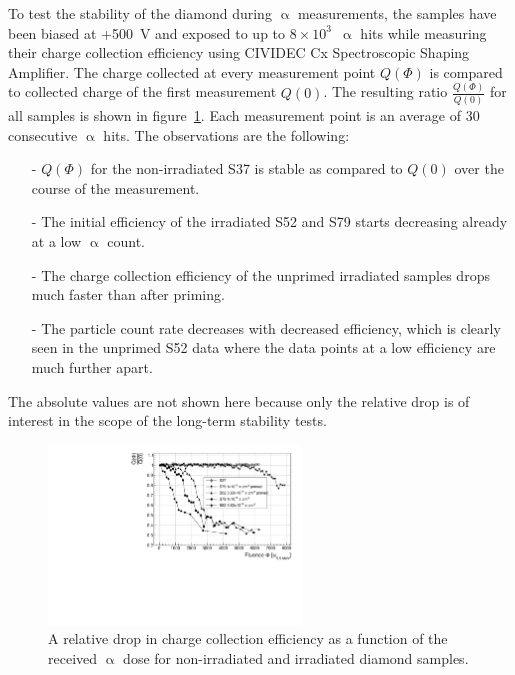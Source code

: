 
To test the stability of the diamond during $\upalpha$ measurements, the samples have been biased at +500~V and exposed to up to $8\times10^3$~$\upalpha$ hits while measuring their charge collection efficiency using CIVIDEC Cx Spectroscopic Shaping Amplifier. The charge collected at every measurement point $Q(\Phi)$ is compared to collected charge of the first measurement $Q(0)$. The resulting ratio $\frac{Q(\Phi)}{Q(0)}$ for all samples is shown in figure~\ref{fig:longtermcx}. Each measurement point is an average of 30 consecutive $\upalpha$ hits. The observations are the following:
\begin{itemize}
\item[-] $Q(\Phi)$ for the non-irradiated S37 is stable as compared to $Q(0)$ over the course of the measurement.
\item[-] The initial efficiency of the irradiated S52 and S79 starts decreasing already at a low $\upalpha$ count.
\item[-] The charge collection efficiency of the unprimed irradiated samples drops much faster than after priming.
\item[-] The particle count rate decreases with decreased efficiency, which is clearly seen in the unprimed S52 data where the data points at a low efficiency are much further apart.
\end{itemize}
The absolute values are not shown here because only the relative drop is of interest in the scope of the long-term stability tests.

\begin{figure}[!t]
\begin{center}
\includegraphics[width=0.6\textwidth]{03_measurement_results/scripts/plots/amplvstimecx4}
\caption{A relative drop in charge collection efficiency as a function of the received $\upalpha$ dose for non-irradiated and irradiated diamond samples.}
\label{fig:longtermcx}
\end{center}
\end{figure}

